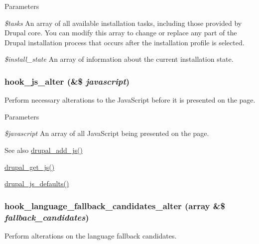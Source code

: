 \begin{DoxyParams}{Parameters}
\item[{\em \$tasks}]An array of all available installation tasks, including those provided by Drupal core. You can modify this array to change or replace any part of the Drupal installation process that occurs after the installation profile is selected. \item[{\em \$install\_\-state}]An array of information about the current installation state. \end{DoxyParams}
\hypertarget{group__hooks_ga4e6dc7148292e5d6ce1754927a5ff06d}{
\subsubsection[{hook\_\-js\_\-alter}]{\setlength{\rightskip}{0pt plus 5cm}hook\_\-js\_\-alter (\&\$ {\em javascript})}}
\label{group__hooks_ga4e6dc7148292e5d6ce1754927a5ff06d}
Perform necessary alterations to the JavaScript before it is presented on the page.


\begin{DoxyParams}{Parameters}
\item[{\em \$javascript}]An array of all JavaScript being presented on the page.\end{DoxyParams}
\begin{DoxySeeAlso}{See also}
\hyperlink{common_8inc_a623370a2c3c2de0390dab078d17dca02}{drupal\_\-add\_\-js()} 

\hyperlink{common_8inc_ac4d279ffd40eae67ace8459cd3e6e3b5}{drupal\_\-get\_\-js()} 

\hyperlink{common_8inc_a55203a07884e02b18a3be2a630c3fab3}{drupal\_\-js\_\-defaults()} 
\end{DoxySeeAlso}
\hypertarget{group__hooks_gad5f456f0d7ae7ddc81a0f49ce66fb1a4}{
\subsubsection[{hook\_\-language\_\-fallback\_\-candidates\_\-alter}]{\setlength{\rightskip}{0pt plus 5cm}hook\_\-language\_\-fallback\_\-candidates\_\-alter (array \&\$ {\em fallback\_\-candidates})}}
\label{group__hooks_gad5f456f0d7ae7ddc81a0f49ce66fb1a4}
Perform alterations on the language fallback candidates.


